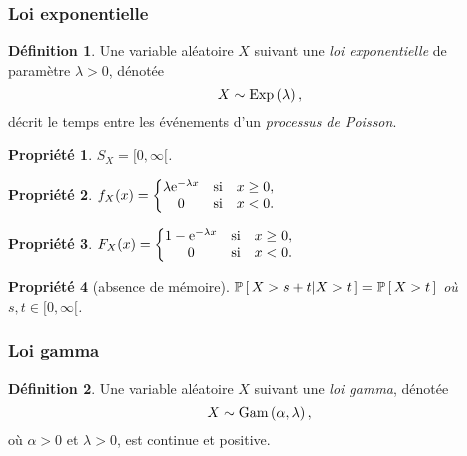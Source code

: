 \documentclass[11pt]{article}
\makeatletter
\renewcommand\P[1]{%
	\ensuremath{%
		\mathbb{P}\left[\,#1\,\right]%
	}%
}%
\newcommand\Pg[2]{%
	\ensuremath{%
		\mathbb{P}\left[\,#1\middle\rvert#2\,\right]%
	}%
}%
\newcommand\e{%
	\ensuremath{%
		\mathrm{e}%
	}%
}%
\newcommand\Exp[1]{%
	\ensuremath{%
		\mathrm{Exp}\left(#1\right)%
	}%
}%
\newcommand\Gam[2]{%
	\ensuremath{%
		\mathrm{Gam}\left(#1,#2\right)%
	}%
}%
\newtheorem{property}{Propriété}
\theoremstyle{remark}
\theoremstyle{definition}
\newtheorem*{@definition}{Définition}
\newenvironment{definition}{%
	\begin{@definition}%
}{%
	\end{@definition}%
	\setcounter{property}{0}%
}
\makeatother
\begin{document}
\subsubsection{Loi exponentielle}
\begin{definition}
	Une variable aléatoire $X$ suivant une \textit{loi exponentielle} de
	paramètre $\lambda>0$, dénotée
	\begin{equation*}
		X\sim\Exp{\lambda},
	\end{equation*}
	décrit le temps entre les événements d'un \textit{processus de Poisson}.
\end{definition}

\begin{property}
	$S_X=[0,\infty[$.
\end{property}

\begin{property}
	$f_X(x)=\left\{
		\begin{matrix}
			\lambda\e^{-\lambda x} & \text{si} & x\geq 0,\\
			0                      & \text{si} & x<0.\\
		\end{matrix}
	\right.$
\end{property}

\begin{property}
	$F_X(x)=\left\{
		\begin{matrix}
			1-\e^{-\lambda x} & \text{si} & x\geq 0,\\
			0                 & \text{si} & x<0.\\
		\end{matrix}
	\right.$
\end{property}

\begin{property}[absence de mémoire]
	$\Pg{X>s+t}{X>t}=\P{X>t}$ où $s,t\in[0,\infty[$.
\end{property}

\subsubsection{Loi gamma}
\begin{definition}
	Une variable aléatoire $X$ suivant une \textit{loi gamma}, dénotée
	\begin{equation*}
		X\sim\Gam{\alpha}{\lambda},
	\end{equation*}
	où $\alpha>0$ et $\lambda>0$, est continue et positive.
\end{definition}
\end{document}
